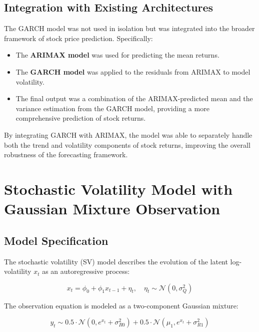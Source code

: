 \subsection{Integration with Existing Architectures}

The GARCH model was not used in isolation but was integrated into the broader framework of stock price prediction. Specifically:

\begin{itemize}
    \item The \textbf{ARIMAX model} was used for predicting the mean returns.
    \item The \textbf{GARCH model} was applied to the residuals from ARIMAX to model volatility.
    \item The final output was a combination of the ARIMAX-predicted mean and the variance estimation from the GARCH model, providing a more comprehensive prediction of stock returns.
\end{itemize}

By integrating GARCH with ARIMAX, the model was able to separately handle both the trend and volatility components of stock returns, improving the overall robustness of the forecasting framework.

\section{Stochastic Volatility Model with Gaussian Mixture Observation}
\label{sec:sv-model}

\subsection{Model Specification}

The stochastic volatility (SV) model describes the evolution of the latent log-volatility $x_t$ as an autoregressive process:

\begin{equation}
x_t = \phi_0 + \phi_1 x_{t-1} + \eta_t, \quad \eta_t \sim \mathcal{N}(0, \sigma_Q^2)
\end{equation}

The observation equation is modeled as a two-component Gaussian mixture:

\begin{equation}
y_t \sim 0.5 \cdot \mathcal{N}(0, e^{x_t} + \sigma_{R0}^2) + 0.5 \cdot \mathcal{N}(\mu_1, e^{x_t} + \sigma_{R1}^2)
\end{equation}

